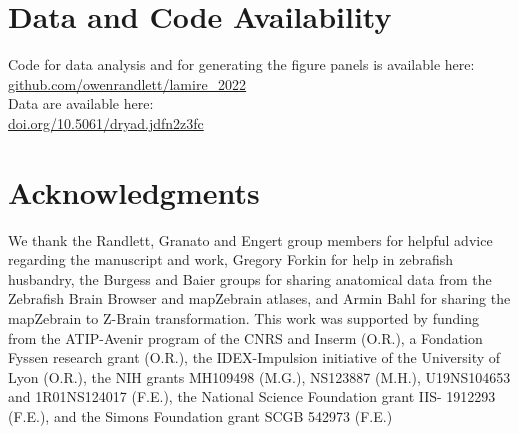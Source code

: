 \documentclass[9pt,lineno]{RandlettLab_elife}
\begin{document}
\section{Data and Code Availability}

Code for data analysis and for generating the figure panels is available here: \\
\href{https://github.com/owenrandlett/lamire_2022}{github.com/owenrandlett/lamire\_2022} \\
Data are available here: \\
\href{https://doi.org/10.5061/dryad.jdfn2z3fc}{doi.org/10.5061/dryad.jdfn2z3fc} 

\section{Acknowledgments}

We thank the Randlett, Granato and Engert group members for helpful advice regarding the manuscript and work, Gregory Forkin for help in zebrafish husbandry, the Burgess and Baier groups for sharing anatomical data from the Zebrafish Brain Browser and mapZebrain atlases, and Armin Bahl for sharing the mapZebrain to Z-Brain transformation. This work was supported by funding from the ATIP-Avenir program of the CNRS and Inserm (O.R.), a Fondation Fyssen research grant (O.R.), the IDEX-Impulsion initiative of the University of Lyon (O.R.), the NIH grants MH109498 (M.G.), NS123887 (M.H.), U19NS104653 and 1R01NS124017 (F.E.), the National Science Foundation grant IIS- 1912293 (F.E.), and the Simons Foundation grant SCGB 542973 (F.E.)





\end{document}
